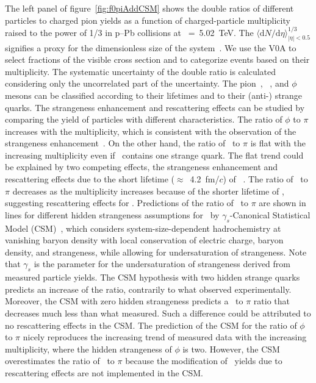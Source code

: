The left panel of figure~\ref{fig:f0piAddCSM} shows the double ratios of different particles to charged pion yields as a function of charged-particle multiplicity raised to the power of 1/3 in p--Pb collisions at \snn~=~5.02~TeV. The $\langle \mathrm{d}N/\mathrm{d}\eta \rangle_{|\eta|<0.5}^{1/3}$ signifies a proxy for the dimensionless size of the system~\cite{Liu:2018xae}. We use the V0A to select fractions of the visible cross section and to categorize events based on their multiplicity. The systematic uncertainty of the double ratio is calculated considering only the uncorrelated part of the uncertainty. The pion~\cite{ALICE:2016dei}, \kstar~\cite{ALICE:2016sak}, and $\phi$~\cite{ALICE:2016sak} mesons can be classified according to their lifetimes and to their (anti-) strange quarks. The strangeness enhancement and rescattering effects can be studied by comparing the yield of particles with different characteristics. The ratio of $\phi$ to $\pi$ increases with the multiplicity, which is consistent with the observation of the strangeness enhancement~\cite{ALICE:2016fzo}. On the other hand, the ratio of \kstar~to $\pi$ is flat with the increasing multiplicity even if \kstar~contains one strange quark. The flat trend could be explained by two competing effects, the strangeness enhancement and rescattering effects due to the short lifetime ($\approx$~4.2~fm/$c$) of \kstar~\cite{ParticleDataGroup:2022pth}. The ratio of \fzero~to $\pi$ decreases as the multiplicity increases because of the shorter lifetime of \fzero, suggesting rescattering effects for \fzero. Predictions of the ratio of \fzero~to $\pi$ are shown in lines for different hidden strangeness assumptions for \fzero~by $\gamma_{s}$-Canonical Statistical Model (CSM)~\cite{Vovchenko:2019kes}, which considers system-size-dependent hadrochemistry at vanishing baryon density with local conservation of electric charge, baryon density, and strangeness, while allowing for undersaturation of strangeness. Note that $\gamma_{s}$ is the parameter for the undersaturation of strangeness derived from measured particle yields. The CSM hypothesis with two hidden strange quarks predicts an increase of the ratio, contrarily to what observed experimentally. Moreover, the CSM with zero hidden strangeness predicts a \fzero~to $\pi$ ratio that decreases much less than what measured. Such a difference could be attributed to no rescattering effects in the CSM. The prediction of the CSM for the ratio of $\phi$ to $\pi$ nicely reproduces the increasing trend of measured data with the increasing multiplicity, where the hidden strangeness of $\phi$ is two. However, the CSM overestimates the ratio of \kstar~to $\pi$ because the modification of \kstar~yields due to rescattering effects are not implemented in the CSM.

